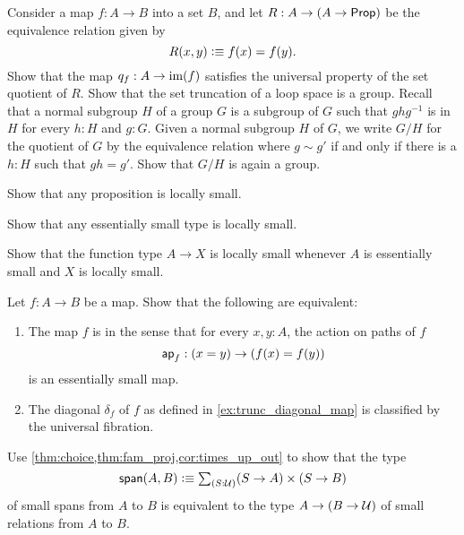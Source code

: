 \begin{exercises}
  \exercise Consider a map $f:A\to B$ into a set $B$, and let $R:A\to(A\to\mathsf{Prop})$ be the equivalence relation given by
  \begin{equation*}
    R(x,y)\vcentcolon\equiv f(x)=f(y).
  \end{equation*}
  Show that the map $q_f:A\to\operatorname{im}(f)$ satisfies the universal property of the set quotient of $R$.
  \exercise Show that the set truncation of a loop space is a group.
  \exercise Recall that a normal subgroup $H$ of a group $G$ is a subgroup of $G$ such that $ghg^{-1}$ is in $H$ for every $h:H$ and $g:G$. Given a normal subgroup $H$ of $G$, we write $G/H$ for the quotient of $G$ by the equivalence relation where $g\sim g'$ if and only if there is a $h:H$ such that $gh=g'$. Show that $G/H$ is again a group. 
\exercise
\begin{subexenum}
\item Show that any proposition is locally small.
\item Show that any essentially small type is locally small.
\item Show that the function type $A\to X$ is locally small whenever $A$ is essentially small and $X$ is locally small.
\end{subexenum}
\exercise Let $f:A\to B$ be a map. Show that the following are equivalent:
\begin{enumerate}
\item The map $f$ is  in the sense that for every $x,y:A$, the action on paths of $f$
\begin{equation*}
\mathsf{ap}_{f}:(x=y)\to (f(x)=f(y))
\end{equation*}
is an essentially small map.
\item The diagonal $\delta_f$ of $f$ as defined in \cref{ex:trunc_diagonal_map} is classified by the universal fibration.
\end{enumerate}
\exercise \label{ex:span_rel}Use \cref{thm:choice,thm:fam_proj,cor:times_up_out} to show that the type 
\begin{equation*}
\mathsf{span}(A,B)\defeq \sm{S:\UU} (S\to A)\times (S\to B)
\end{equation*}
of small spans from $A$ to $B$ is equivalent to the type $A\to (B\to\mathcal{U})$ of small relations from $A$ to $B$.
\end{exercises}
